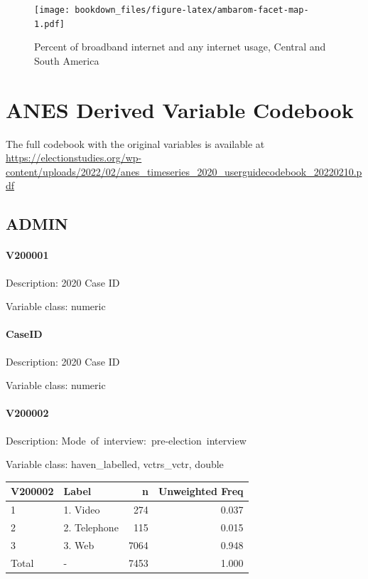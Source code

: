 \documentclass[
]{krantz}
\begin{document}
\begin{figure}
\centering
\texttt{[image: bookdown\_files/figure-latex/ambarom-facet-map-1.pdf]}
\caption{\label{fig:ambarom-facet-map}Percent of broadband internet and any internet usage, Central and South America}
\end{figure}

\cleardoublepage

\hypertarget{appendix-appendices}{%
\appendix {}}


\hypertarget{anes-cb}{%
\chapter{ANES Derived Variable Codebook}\label{anes-cb}}

The full codebook with the original variables is available at \url{https://electionstudies.org/wp-content/uploads/2022/02/anes_timeseries_2020_userguidecodebook_20220210.pdf}

\hypertarget{admin}{%
\section{ADMIN}\label{admin}}

\hypertarget{v200001}{%
\subsubsection*{V200001}\label{v200001}}


Description: 2020 Case ID

Variable class: numeric

\hypertarget{caseid}{%
\subsubsection*{CaseID}\label{caseid}}


Description: 2020 Case ID

Variable class: numeric

\hypertarget{v200002}{%
\subsubsection*{V200002}\label{v200002}}


Description: Mode~of~interview:~pre-election~interview

Variable class: haven\_labelled, vctrs\_vctr, double

\begin{tabular}[t]{l|l|r|r}
\hline
V200002 & Label & n & Unweighted Freq\\
\hline
1 & 1. Video & 274 & 0.037\\
\hline
2 & 2. Telephone & 115 & 0.015\\
\hline
3 & 3. Web & 7064 & 0.948\\
\hline
Total & - & 7453 & 1.000\\
\hline
\end{tabular}
\end{document}
